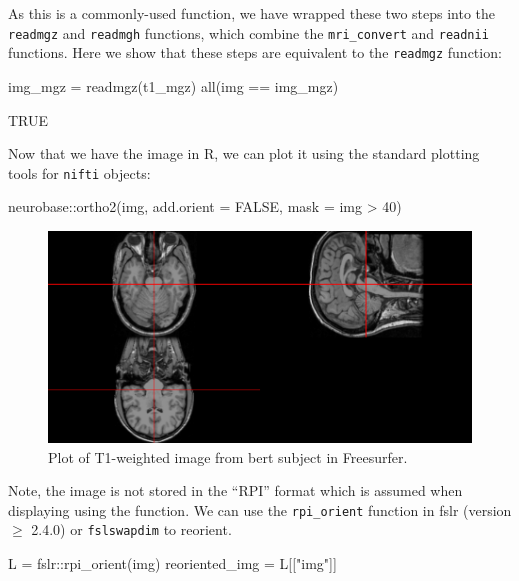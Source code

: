 As this is a commonly-used function, we have wrapped these two steps
into the \texttt{readmgz} and \texttt{readmgh} functions, which combine
the \texttt{mri\_convert} and \texttt{readnii} functions. Here we show
that these steps are equivalent to the \texttt{readmgz} function:

\begin{Schunk}
\begin{Sinput}
img_mgz = readmgz(t1_mgz)
all(img == img_mgz)
\end{Sinput}
\begin{Soutput}
[1] TRUE
\end{Soutput}
\end{Schunk}

Now that we have the image in R, we can plot it using the standard
plotting tools for \texttt{nifti} objects:

\begin{Schunk}
\begin{Sinput}
neurobase::ortho2(img, add.orient = FALSE, mask = img > 40)
\end{Sinput}
\begin{figure}
\includegraphics{Freesurfer_files/figure-latex/mri_plot-1} \caption[Plot of T1-weighted image from bert subject in Freesurfer]{Plot of T1-weighted image from bert subject in Freesurfer.}\label{fig:mri_plot}
\end{figure}
\end{Schunk}

Note, the image is not stored in the ``RPI'' format which is assumed
when displaying using the   function. We can
use the \texttt{rpi\_orient} function in fslr (version \(\geq\) 2.4.0)
or \texttt{fslswapdim} to reorient.

\begin{Schunk}
\begin{Sinput}
L = fslr::rpi_orient(img)
reoriented_img = L[["img"]]
\end{Sinput}
\end{Schunk}

